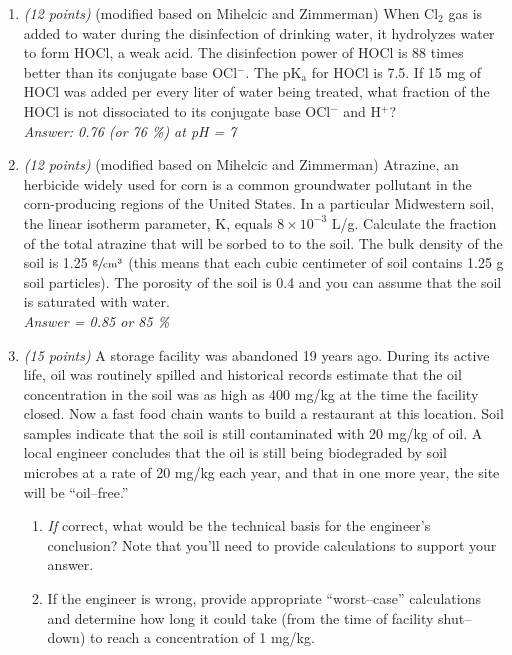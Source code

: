 \documentclass[12pt,letterpaper]{article}
\begin{document}
\begin{enumerate}
\item \emph{(12 points)} (modified based on Mihelcic and Zimmerman) When Cl$_2$ gas is added to water during the disinfection of drinking water, it hydrolyzes water to form HOCl, a weak acid. The disinfection power of HOCl is 88 times better than its conjugate base OCl$^-$.  The pK$\mathrm{_a}$ for HOCl is 7.5.  If 15 mg of HOCl was added per every liter of water being treated, what fraction of the HOCl is not dissociated to its conjugate base OCl$^-$ and H$^+$?\\\emph{ Answer: 0.76 (or 76 \%) at pH = 7}

\item \emph{(12 points)} (modified based on Mihelcic and Zimmerman) Atrazine, an herbicide widely used for corn is a common groundwater pollutant in the corn-producing regions of the United States.  In a particular Midwestern soil, the linear isotherm parameter, K, equals $8\times 10^{-3}$ L/g.  Calculate the fraction of the total atrazine that will be sorbed to to the soil.  The bulk density of the soil is 1.25 $\mathrm{\sfrac{g}{cm^3}}$ (this means that each cubic centimeter of soil contains 1.25 g soil particles).  The porosity of the soil is 0.4 and you can assume that the soil is saturated with water.\\\emph{Answer = 0.85 or 85 \%}

\item \emph{(15 points)} A storage facility was abandoned 19 years ago.  During its active life, oil was routinely spilled and historical records estimate that the oil concentration in the soil was as high as 400 mg/kg at the time the facility closed.  Now a fast food chain wants to build a restaurant at this location.  Soil samples indicate that the soil is still contaminated with 20 mg/kg of oil.  A local engineer concludes that the oil is still being biodegraded by soil microbes at a rate of 20 mg/kg each year, and that in one more year, the site will be ``oil--free.''

\begin{enumerate}
\item \emph{If} correct, what would be the technical basis for the engineer's conclusion? Note that you'll need to provide calculations to support your answer.
\item If the engineer is wrong, provide appropriate ``worst--case'' calculations and determine how long it could take (from the time of facility shut--down) to reach a concentration of 1 mg/kg.
\end{enumerate}


\end{enumerate}
\end{document}
